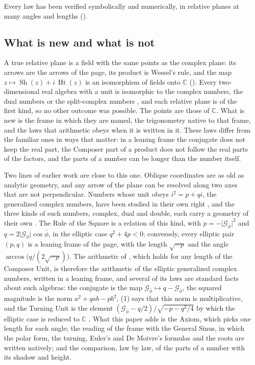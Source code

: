 \documentclass[11pt,a4paper]{amsart}
\theoremstyle{plain}
\theoremstyle{definition}
\theoremstyle{remark}
\newcommand{\pb}{\bar{\phi}}                     %
\newcommand{\Gp}{\mathcal{G}_{\bar{\phi}}}       %
\newcommand{\C}{\mathbb{C}}
\DeclareMathOperator{\Sh}{Sh}                    %
\DeclareMathOperator{\Ht}{Ht}                    %
\begin{document}
Every law has been verified symbolically and numerically, in relative planes at many angles and lengths ().

\subsection{What is new and what is not}

A true relative plane is a field with the same points as the complex plane: its arrows are the arrows of the page, its product is Wessel's rule, and the map $z \mapsto \Sh(z) + i\,\Ht(z)$ is an isomorphism of fields onto $\C$ (). Every two-dimensional real algebra with a unit is isomorphic to the complex numbers, the dual numbers or the split-complex numbers \citep{KantorSolodovnikov1989}, and each relative plane is of the first kind, so no other outcome was possible. The points are those of $\C$. What is new is the frame in which they are named, the trigonometry native to that frame, and the laws that arithmetic obeys when it is written in it. These laws differ from the familiar ones in ways that matter: in a leaning frame the conjugate does not keep the real part, the Composer part of a product does not follow the real parts of the factors, and the parts of a number can be longer than the number itself.

Two lines of earlier work are close to this one. Oblique coordinates are as old as analytic geometry, and any arrow of the plane can be resolved along two axes that are not perpendicular. Numbers whose unit obeys $i^2 = p + qi$, the generalized complex numbers, have been studied in their own right \citep{HarkinHarkin2004}, and the three kinds of such numbers, complex, dual and double, each carry a geometry of their own \citep{Yaglom1968}. The Rule of the Square is a relation of this kind, with $p = -\lvert\Gp\rvert^2$ and $q = 2\lvert\Gp\rvert\cos\pb$, in the elliptic case $q^2 + 4p < 0$; conversely, every elliptic pair $(p, q)$ is a leaning frame of the page, with the length $\sqrt{-p}$ and the angle $\arccos\bigl(q/(2\sqrt{-p})\bigr)$. The arithmetic of , which holds for any length of the Composer Unit, is therefore the arithmetic of the elliptic generalized complex numbers, written in a leaning frame, and several of its laws are standard facts about such algebras: the conjugate is the map $\Gp \mapsto q - \Gp$, the squared magnitude is the norm $a^2 + qab - pb^2$, (1) says that this norm is multiplicative, and the Turning Unit is the element $(\Gp - q/2)/\sqrt{-p - q^2/4}$ by which the elliptic case is reduced to $\C$ \citep{KantorSolodovnikov1989,Yaglom1968}. What this paper adds is the Axiom, which picks one length for each angle; the reading of the frame with the General Sinus, in which the polar form, the turning, Euler's and De Moivre's formulas and the roots are written natively; and the comparison, law by law, of the parts of a number with its shadow and height.
\end{document}
